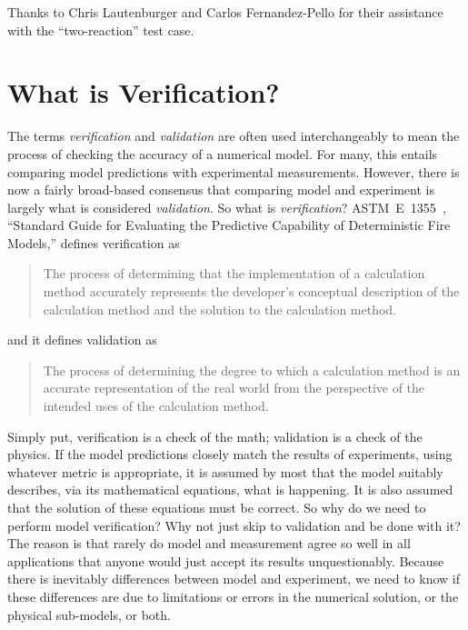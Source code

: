 \documentclass[11pt]{book}
\begin{document}
Thanks to Chris Lautenburger and Carlos Fernandez-Pello for their assistance with the ``two-reaction'' test case.



\tableofcontents

\mainmatter


\chapter{What is Verification?}

The terms {\em verification} and {\em validation} are often used interchangeably to mean the process of checking the
accuracy of a numerical model. For many, this entails comparing model predictions with experimental measurements. However,
there is now a fairly broad-based consensus that comparing model and experiment is largely what is considered {\em validation}. So what is
{\em verification}? ASTM~E~1355~\cite{ASTM:E1355}, ``Standard Guide for
Evaluating the Predictive Capability of Deterministic Fire Models,'' defines verification as
\begin{quote}
The process of determining that the implementation of a calculation method accurately
represents the developer's conceptual description of the calculation method and the solution to the calculation method.
\end{quote}
and it defines validation as
\begin{quote}
The process of determining the degree to which a calculation method is an accurate representation of the real world
from the perspective of the intended uses of the calculation method.
\end{quote}
Simply put, verification is a check of the math; validation is a check of the physics. If the model predictions closely match
the results of experiments, using whatever metric is appropriate, it is assumed by most that the model suitably describes, via
its mathematical equations, what is happening. It is also assumed that the solution of these equations must be correct. So why do
we need to perform model verification? Why not just skip to validation and be done with it? The reason is that rarely do model and
measurement agree so well in all applications that anyone would just accept its results unquestionably. Because there is
inevitably differences between model and experiment, we need to know if these differences are due to limitations or errors in
the numerical solution, or the physical sub-models, or both.
\end{document}
